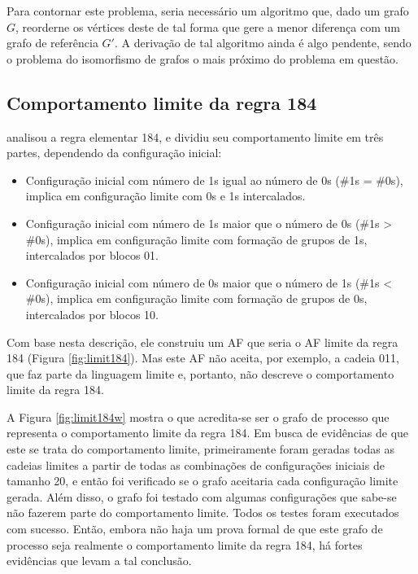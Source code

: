 \documentclass[12pt,a4paper]{article}
\begin{document}
Para contornar este problema, seria necessário um algoritmo que, dado
um grafo $G$, reorderne os vértices deste de tal forma que gere a menor
diferença com um grafo de referência $G'$. A derivação de tal algoritmo
ainda é algo pendente, sendo o problema do isomorfismo de grafos o mais
próximo do problema em questão.

\subsection{Comportamento limite da regra 184}

 analisou a regra elementar 184, e dividiu seu
comportamento limite em três partes, dependendo da configuração inicial:

\begin{itemize}
\item Configuração inicial com número de 1s igual ao número de 0s
(\#1s = \#0s), implica em configuração limite com 0s e 1s
intercalados.

\item Configuração inicial com número de 1s maior que o número de 0s
(\#1s > \#0s), implica em configuração limite com formação de grupos de
1s, intercalados por blocos 01.

\item Configuração inicial com número de 0s maior que o número de 1s
(\#1s < \#0s), implica em configuração limite com formação de grupos
de 0s, intercalados por blocos 10.
\end{itemize}

Com base nesta descrição, ele construiu um AF que seria
o AF limite da regra 184 (Figura \ref{fig:limit184}). Mas este AF não
aceita, por exemplo, a cadeia 011, que faz parte da linguagem limite e,
portanto, não descreve o comportamento limite da regra 184.  

A Figura \ref{fig:limit184w} mostra o que acredita-se ser o grafo de processo
que representa o comportamento limite da regra 184. Em busca de evidências
de que este se trata do comportamento limite, primeiramente foram geradas
todas as cadeias limites a partir de todas as combinações de configurações
iniciais de tamanho 20, e então foi verificado se o grafo aceitaria cada
configuração limite gerada. Além disso, o grafo foi testado com algumas
configurações que sabe-se não fazerem parte do comportamento limite.
Todos os testes foram executados com sucesso.
Então, embora não haja um prova formal de que este grafo de processo seja
realmente o comportamento limite da regra 184, há fortes evidências que
levam a tal conclusão.
\end{document}
